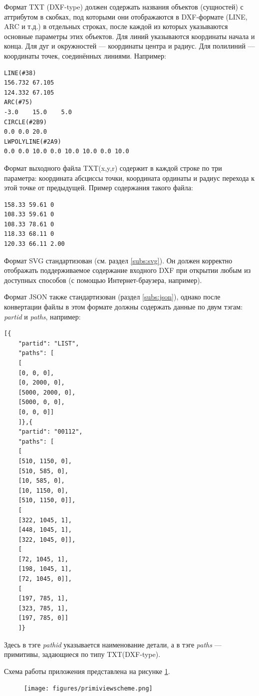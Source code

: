 Формат TXT (DXF-type) должен содержать названия объектов (сущностей) с аттрибутом в скобках, под которыми они отображаются в DXF-формате (LINE, ARC и т.д.) в отдельных строках, после каждой из которых указываются основные параметры этих объектов. Для линий указываются координаты начала и конца. Для дуг и окружностей --- координаты центра и радиус. Для полилиний --- координаты точек, соединённых линиями. Например:
\begin{lstlisting}[label=list:dxftxtscheme]
LINE(#38)
156.732	67.105
124.332	67.105
ARC(#75)
-3.0	15.0	5.0
CIRCLE(#2B9)
0.0 0.0 20.0
LWPOLYLINE(#2A9)
0.0 0.0 10.0 0.0 10.0 10.0 0.0 10.0 
\end{lstlisting}

Формат выходного файла TXT(x,y,r) содержит в каждой строке по три параметра: координата абсциссы точки, координата ординаты и радиус перехода к этой точке от предыдущей. Пример содержания такого файла:
\begin{lstlisting}[label=list:dxftxtscheme]
158.33 59.61 0
108.33 59.61 0
108.33 78.61 0
118.33 68.11 0
120.33 66.11 2.00
\end{lstlisting}

Формат SVG стандартизован (см. раздел \ref{subs:svg}). Он должен корректно отображать поддерживаемое содержание входного DXF при открытии любым из доступных способов (с помощью Интернет-браузера, например).

Формат JSON также стандартизован (раздел \ref{subs:json}), однако после конвертации файлы в этом формате должны содержать данные по двум тэгам: \textit{partid} и \textit{paths}, например:
\begin{lstlisting}[label=list:dxftxtscheme]
[{
	"partid": "LIST",
	"paths": [
	[
	[0, 0, 0],
	[0, 2000, 0],
	[5000, 2000, 0],
	[5000, 0, 0],
	[0, 0, 0]]
	]},{
	"partid": "00112",
	"paths": [
	[
	[510, 1150, 0],
	[510, 585, 0],
	[10, 585, 0],
	[10, 1150, 0],
	[510, 1150, 0]],
	[
	[322, 1045, 1],
	[448, 1045, 1],
	[322, 1045, 0]],
	[
	[72, 1045, 1],
	[198, 1045, 1],
	[72, 1045, 0]],
	[
	[197, 785, 1],
	[323, 785, 1],
	[197, 785, 0]]
	]}
\end{lstlisting}

Здесь в тэге \textit{pathid} указывается наименование детали, а в тэге \textit{paths} --- примитивы, задающиеся по типу TXT(DXF-type).

Схема работы приложения представлена на рисунке \ref{fig:primiviewscheme}.

\begin{figure}[H]
	\centering
	\texttt{[image: figures/primiviewscheme.png]}
	\label{fig:primiviewscheme}
\end{figure}

